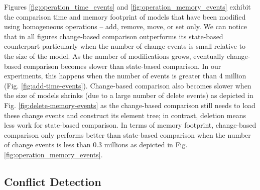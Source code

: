Figures \ref{fig:operation_time_events} and \ref{fig:operation_memory_events} exhibit the comparison time and memory footprint of models that have been modified using homogeneous operations -- \textsf{add}, \textsf{remove}, \textsf{move}, or \textsf{set} only. We can notice that in all figures change-based comparison outperforms its state-based counterpart particularly when the number of change events is small relative to the size of the model. As the number of modifications grows, eventually change-based comparison becomes slower than state-based comparison. In our experiments, this happens when the number of events is greater than 4 million (Fig. \ref{fig:add-time-events}). Change-based comparison also becomes slower when the size of models shrinks (due to a large number of delete events) as depicted in Fig. \ref{fig:delete-memory-events} as the change-based comparison still needs to load these change events and construct its element tree; in contrast, deletion means less work for state-based comparison. In terms of memory footprint, change-based comparison only performs better than state-based comparison when the number of change events is less than 0.3 millions as depicted in Fig. \ref{fig:operation_memory_events}.

\subsection{Conflict Detection}
\label{sec:conflict_results}

